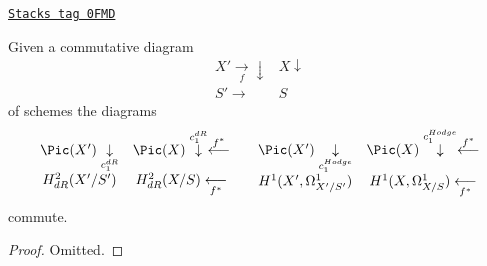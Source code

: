 \begin{lemma}[Pullback c1]
\label{derham-lemma-pullback-c1}
\href{https://stacks.math.columbia.edu/tag/0FMD}{\texttt{Stacks tag 0FMD}}

Given a commutative diagram
$$
\begin{array}{cc}X' \underset{f}{\longrightarrow}\downarrow & X \downarrow \\ S' \longrightarrow & S\end{array}
$$
of schemes the diagrams
$$
\begin{array}{cc}\Pic(X') \underset{c_1^{dR}}{\downarrow} & \Pic(X) \overset{c_1^{dR}}{\downarrow}\overset{f^*}{\longleftarrow} \\ H^2_{dR}(X'/S') & H^2_{dR}(X/S) \underset{f^*}{\longleftarrow}\end{array}
\quad
\begin{array}{cc}\Pic(X') \underset{c_1^{Hodge}}{\downarrow} & \Pic(X) \overset{c_1^{Hodge}}{\downarrow}\overset{f^*}{\longleftarrow} \\ H^1(X', \Omega^1_{X'/S'}) & H^1(X, \Omega^1_{X/S}) \underset{f^*}{\longleftarrow}\end{array}
$$
commute.
\end{lemma}

\begin{proof}
Omitted.
\end{proof}

